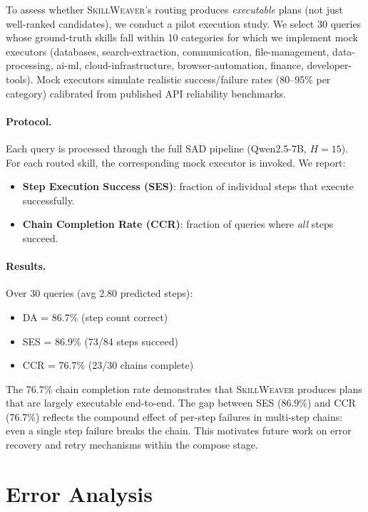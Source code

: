 \documentclass[11pt]{article}
\newcommand{\system}{\textsc{SkillWeaver}}
\begin{document}
To assess whether \system{}'s routing produces \emph{executable} plans (not just well-ranked candidates), we conduct a pilot execution study.
We select 30 queries whose ground-truth skills fall within 10 categories for which we implement mock executors (databases, search-extraction, communication, file-management, data-processing, ai-ml, cloud-infrastructure, browser-automation, finance, developer-tools).
Mock executors simulate realistic success/failure rates (80--95\% per category) calibrated from published API reliability benchmarks.

\paragraph{Protocol.}
Each query is processed through the full SAD pipeline (Qwen2.5-7B, $H{=}15$).
For each routed skill, the corresponding mock executor is invoked.
We report:
\begin{itemize}[nosep,leftmargin=*]
\item \textbf{Step Execution Success (SES)}: fraction of individual steps that execute successfully.
\item \textbf{Chain Completion Rate (CCR)}: fraction of queries where \emph{all} steps succeed.
\end{itemize}

\paragraph{Results.}
Over 30 queries (avg 2.80 predicted steps):
\begin{itemize}[nosep,leftmargin=*]
\item DA = 86.7\% (step count correct)
\item SES = 86.9\% (73/84 steps succeed)
\item CCR = 76.7\% (23/30 chains complete)
\end{itemize}

The 76.7\% chain completion rate demonstrates that \system{} produces plans that are largely executable end-to-end.
The gap between SES (86.9\%) and CCR (76.7\%) reflects the compound effect of per-step failures in multi-step chains: even a single step failure breaks the chain.
This motivates future work on error recovery and retry mechanisms within the compose stage.

\section{Error Analysis}
\label{sec:analysis-app}
\end{document}
